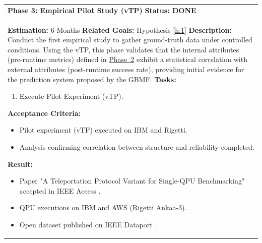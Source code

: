 \documentclass{article}
\begin{document}
\begin{longtable}{@{}p{\textwidth}@{}}
    \textbf{Phase 3: Empirical Pilot Study (vTP)} \label{p:3} \hfill \textbf{Status: DONE} \\
    \textbf{Estimation:} 6 Months \newline
    \textbf{Related Goals:} Hypothesis \ref{h:1} \newline
    \textbf{Description:} Conduct the first empirical study to gather ground-truth data under controlled conditions. Using the vTP, this phase validates that the internal attributes (pre-runtime metrics) defined in \hyperref[p:2]{Phase~2} exhibit a statistical correlation with external attributes (post-runtime success rate), providing initial evidence for the prediction system proposed by the GBMF. \newline
    \textbf{Tasks:}
    \begin{enumerate}[label=T3.\arabic*, ref=T3.\arabic*, font=\bfseries, leftmargin=3.5em, labelindent=0pt, itemindent=0pt, labelsep=0.5em, noitemsep, topsep=0pt]
        \item \label{p3:t1} Execute Pilot Experiment (vTP).
    \end{enumerate}
    \textbf{Acceptance Criteria:}
    \begin{itemize}[leftmargin=1.5em, labelindent=0pt, itemindent=0pt, noitemsep, topsep=0pt]
        \item Pilot experiment (vTP) executed on IBM and Rigetti.
        \item Analysis confirming correlation between structure and reliability completed.
    \end{itemize}
    \textbf{Result:}
    \begin{itemize}[leftmargin=1.5em, labelindent=0pt, itemindent=0pt, noitemsep, topsep=0pt]
        \item Paper "A Teleportation Protocol Variant for Single-QPU Benchmarking" accepted in IEEE Access \cite{ieeevTp2025}.
        \item QPU executions on IBM and AWS (Rigetti Ankaa-3).
        \item Open dataset published on IEEE Dataport \cite{data_1}.
    \end{itemize} \\
    \midrule


\end{longtable}
\end{document}
